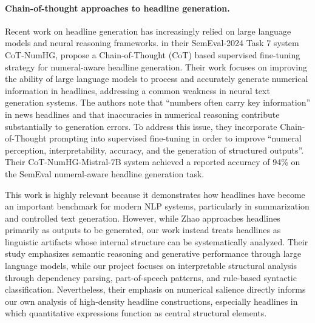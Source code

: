 \documentclass[11pt]{article}
\begin{document}
\paragraph{Chain-of-thought approaches to headline generation.} Recent work on headline generation has increasingly relied on large language models and neural reasoning frameworks. \citet{zhao-etal-2024-ncl} in their SemEval-2024 Task 7 system CoT-NumHG, propose a Chain-of-Thought (CoT) based supervised fine-tuning strategy for numeral-aware headline generation. Their work focuses on improving the ability of large language models to process and accurately generate numerical information in headlines, addressing a common weakness in neural text generation systems. The authors note that ``numbers often carry key information'' in news headlines and that inaccuracies in numerical reasoning contribute substantially to generation errors. To address this issue, they incorporate Chain-of-Thought prompting into supervised fine-tuning in order to improve ``numeral perception, interpretability, accuracy, and the generation of structured outputs''. Their CoT-NumHG-Mistral-7B system achieved a reported accuracy of 94\% on the SemEval numeral-aware headline generation task.

This work is highly relevant because it demonstrates how headlines have become an important benchmark for modern NLP systems, particularly in summarization and controlled text generation. However, while Zhao approaches headlines primarily as outputs to be generated, our work instead treats headlines as linguistic artifacts whose internal structure can be systematically analyzed. Their study emphasizes semantic reasoning and generative performance through large language models, while our project focuses on interpretable structural analysis through dependency parsing, part-of-speech patterns, and rule-based syntactic classification. Nevertheless, their emphasis on numerical salience directly informs our own analysis of high-density headline constructions, especially headlines in which quantitative expressions function as central structural elements.
\end{document}
